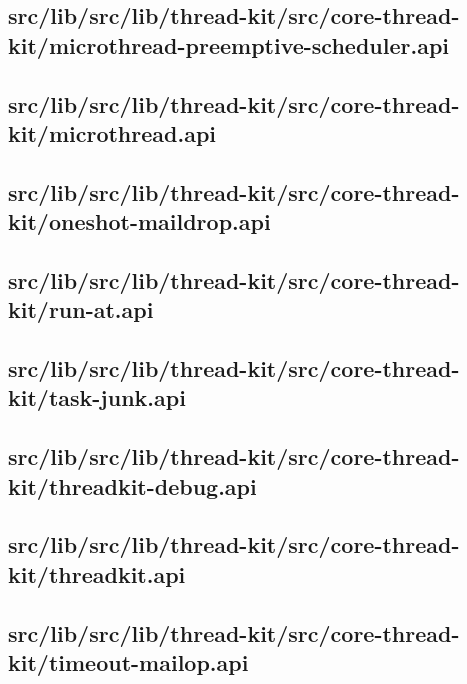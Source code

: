\subsection{src/lib/src/lib/thread-kit/src/core-thread-kit/microthread-preemptive-scheduler.api}


\subsection{src/lib/src/lib/thread-kit/src/core-thread-kit/microthread.api}


\subsection{src/lib/src/lib/thread-kit/src/core-thread-kit/oneshot-maildrop.api}


\subsection{src/lib/src/lib/thread-kit/src/core-thread-kit/run-at.api}


\subsection{src/lib/src/lib/thread-kit/src/core-thread-kit/task-junk.api}


\subsection{src/lib/src/lib/thread-kit/src/core-thread-kit/threadkit-debug.api}


\subsection{src/lib/src/lib/thread-kit/src/core-thread-kit/threadkit.api}


\subsection{src/lib/src/lib/thread-kit/src/core-thread-kit/timeout-mailop.api}


